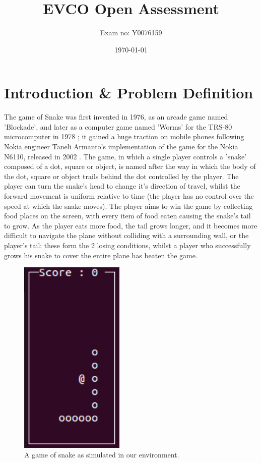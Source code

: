 \documentclass[british,10pt,a4paper]{article}
\begin{document}
\title{EVCO Open Assessment}
\author{Exam no: Y0076159}
\date{\today}
\maketitle
\tableofcontents
\listoffigures
\clearpage
\section{Introduction \& Problem Definition}
The game of Snake was first invented in 1976, as an arcade game named 'Blockade', and later as a computer game named 'Worms' for the TRS-80 microcomputer in 1978 \cite{Goggin2010-ao}; it gained a huge traction on mobile phones following Nokia engineer Taneli Armanto's implementation of the game for the Nokia N6110, released in 2002 \cite{Goggin2010-ao}. The game, in which a single player controls a 'snake' composed of a dot, square or object, is named after the way in which the body of the dot, square or object trails behind the dot controlled by the player. The player can turn the snake's head to change it's direction of travel, whilst the forward movement is uniform relative to time (the player has no control over the speed at which the snake moves). The player aims to win the game by collecting food places on the screen, with every item of food eaten causing the snake's tail to grow. As the player eats more food, the tail grows longer, and it becomes more difficult to navigate the plane without colliding with a surrounding wall, or the player's tail: these form the 2 losing conditions, whilst a player who successfully grows his snake to cover the entire plane has beaten the game.  \newline
\begin{figure}
	\includegraphics[width=5cm,keepaspectratio]{images/snake.png}
	\caption{A game of snake as simulated in our environment.}
	\label{fig:snake}
\end{figure}
\end{document}
